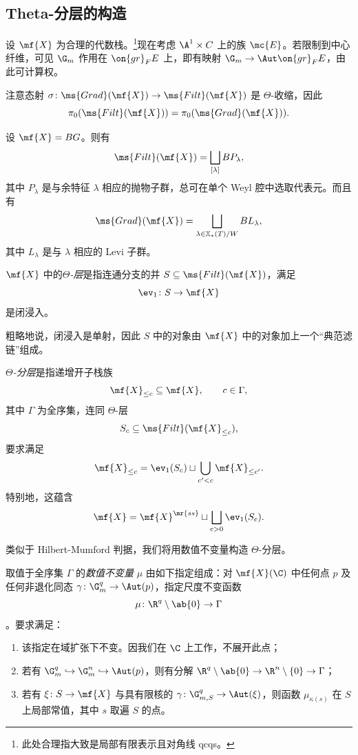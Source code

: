 \subsection{Theta-分层的构造}%
\label{sub:Construction of Theta-stratifications}

设 \(\mf{X}\) 为合理的代数栈。\footnote{此处合理指大致是局部有限表示且对角线 qcqs。}现在考虑 \(\A^1 \times C\) 上的族 \(\mc{E}\)。若限制到中心纤维，可见 \(\G_m\) 作用在 \(\on{gr}_F E\) 上，即有映射 \(\G_m \to \Aut \on{gr}_F E\)，由此可计算权。

注意态射 \(\sigma \colon \ms{Grad}(\mf{X}) \to \ms{Filt}(\mf{X})\) 是 \(\Theta\)-收缩，因此
\[ \pi_0(\ms{Filt}(\mf{X})) = \pi_0(\ms{Grad}(\mf{X})). \]

\begin{exm}
    设 \(\mf{X} = BG\)。则有
    \[\ms{Filt}(\mf{X}) = \bigsqcup_{[\lambda]} B P_{\lambda}, \]
    其中 \(P_{\lambda}\) 是与余特征 \(\lambda\) 相应的抛物子群，总可在单个 Weyl 腔中选取代表元。而且有
    \[ \ms{Grad}(\mf{X}) = \bigsqcup_{\lambda \in \mathbb{X}_*(T)/W} B L_{\lambda}, \]
    其中 \(L_{\lambda}\) 是与 \(\lambda\) 相应的 Levi 子群。
\end{exm}

\begin{defn}
    \(\mf{X}\) 中的\textit{\(\Theta\)-层}是指连通分支的并 \(S \subseteq \ms{Filt}(\mf{X})\)，满足
    \[ \ev_1 \colon S \to \mf{X} \]
    是闭浸入。
\end{defn}

粗略地说，闭浸入是单射，因此 \(S\) 中的对象由 \(\mf{X}\) 中的对象加上一个“典范滤链”组成。

\begin{defn}
    \textit{\(\Theta\)-分层}是指递增开子栈族
    \[ \mf{X}_{\leq c} \subseteq \mf{X}, \qquad c \in \Gamma, \]
    其中 \(\Gamma\) 为全序集，连同 \(\Theta\)-层
    \[ S_c \subseteq \ms{Filt}(\mf{X}_{\leq c}), \]
    要求满足
    \[ \mf{X}_{\leq c} = \ev_1(S_c) \sqcup \bigcup_{c' < c} \mf{X}_{\leq c'}. \]
    特别地，这蕴含
    \[ \mf{X} = \mf{X}^{\mr{ss}} \sqcup \bigsqcup_{c > 0} \ev_1(S_c). \]
\end{defn}

类似于 Hilbert-Mumford 判据，我们将用数值不变量构造 \(\Theta\)-分层。
\begin{defn}
    取值于全序集 \(\Gamma\) 的\textit{数值不变量} \(\mu\) 由如下指定组成：对 \(\mf{X}(\C)\) 中任何点 \(p\) 及任何非退化同态 \(\gamma \colon \G_m^q \to \Aut(p)\)，指定尺度不变函数
    \[ \mu \colon \R^q \setminus \ab\{0\} \to \Gamma \]
    。要求满足：
    \begin{enumerate}
        \item 该指定在域扩张下不变。因我们在 \(\C\) 上工作，不展开此点；
        \item 若有 \(\G_m^q \hookrightarrow \G_m^n \hookrightarrow \Aut(p)\)，则有分解 \(\R^q \setminus \ab\{0\} \to \R^n \setminus \{0\} \to \Gamma\)；
        \item 若有 \(\xi \colon S \to \mf{X}\) 与具有限核的 \(\gamma \colon \G_{m, S}^q \to \Aut(\xi)\)，则函数 \(\mu_{\kappa(s)}\) 在 \(S\) 上局部常值，其中 \(s\) 取遍 \(S\) 的点。
    \end{enumerate}
\end{defn}

